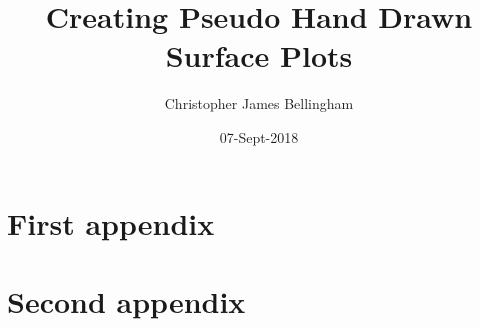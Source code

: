 \documentclass{mproj}
\begin{document}
\title{Creating Pseudo Hand Drawn Surface Plots}
\author{Christopher James Bellingham}
\date{07-Sept-2018}
\maketitle



\educationalconsent

\newpage


\tableofcontents







\appendix
\chapter{First appendix}
\chapter{Second appendix}



\end{document}
